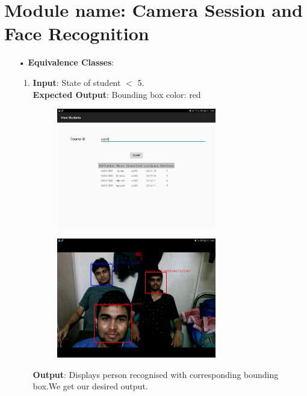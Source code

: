 \documentclass{scrreprt}
\begin{document}
\section{Module name: Camera Session and Face Recognition}
\begin{itemize}
\item[•]\textbf{Equivalence Classes}:
\begin{enumerate}
\item \textbf{Input}: State of student $<$ 5.\\
\textbf{Expected Output}: Bounding box color: red
\begin{figure}[H]
\centering
\includegraphics[width=0.7\textwidth, keepaspectratio]{camstate.jpg}
\end{figure}
\begin{figure}[H]
\centering
\includegraphics[width=0.7\textwidth, keepaspectratio]{cam3stud.jpg}
\end{figure}
\textbf{Output}: Displays person recognised with corresponding bounding box.We get our desired output.


\end{enumerate}
\end{itemize}
\end{document}
